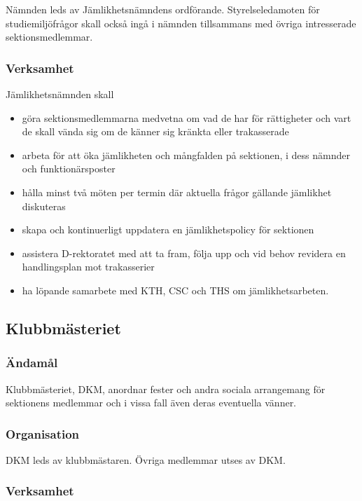 \documentclass{dgovdoc}
\begin{document}
Nämnden leds av Jämlikhetsnämndens ordförande. Styrelseledamoten för
studiemiljöfrågor skall också ingå i nämnden tillsammans med övriga
intresserade sektionsmedlemmar.

\subsubsection{Verksamhet}

Jämlikhetsnämnden skall

\begin{itemize}
  \item göra sektionsmedlemmarna medvetna om vad de har för rättigheter och
    vart de skall vända sig om de känner sig kränkta eller trakasserade
  \item arbeta för att öka jämlikheten och mångfalden på sektionen, i dess
    nämnder och funktionärsposter
  \item hålla minst två möten per termin där aktuella frågor gällande jämlikhet
    diskuteras
  \item skapa och kontinuerligt uppdatera en jämlikhetspolicy för sektionen
  \item assistera D-rektoratet med att ta fram, följa upp och vid behov
    revidera en handlingsplan mot trakasserier
  \item ha löpande samarbete med KTH, CSC och THS om jämlikhetsarbeten.
\end{itemize}

\subsection{Klubbmästeriet}

\subsubsection{Ändamål}

Klubbmästeriet, DKM, anordnar fester och andra sociala arrangemang för
sektionens medlemmar och i vissa fall även deras eventuella vänner.

\subsubsection{Organisation}

DKM leds av klubbmästaren. Övriga medlemmar utses av DKM.

\subsubsection{Verksamhet}
\end{document}
